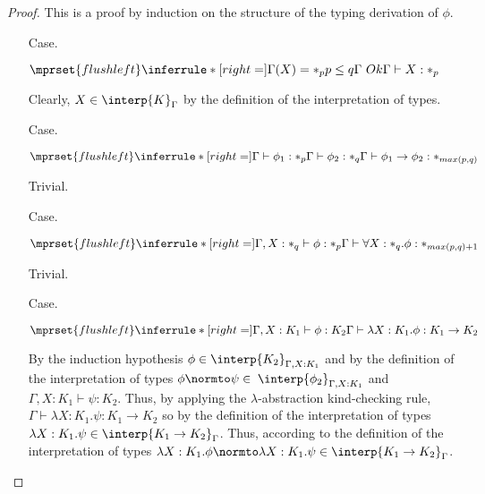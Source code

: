 \begin{proof}
  This is a proof by induction on the structure of the typing derivation of $\phi$.
  
  \begin{itemize}
  \item[Case.]\ \\
    \begin{center}
      \begin{math}
        $$\mprset{flushleft}
        \inferrule* [right=] {
          \Gamma(X) = *_p
          \\
          p \leq q
          \\
          \Gamma\ Ok
        }{\Gamma \vdash X:*_p}
      \end{math}
    \end{center}
    Clearly, $X \in \interp{K}_\Gamma$ by the definition of the interpretation of types.
    
  \item[Case.]\ \\
    \begin{center}
      \begin{math}
        $$\mprset{flushleft}
        \inferrule* [right=] {
          \Gamma \vdash \phi_1 : *_p
          \\
          \Gamma \vdash \phi_2 : *_q
        }{\Gamma \vdash \phi_1 \rightarrow \phi_2 : *_{max(p,q)}}
      \end{math}
    \end{center}
    Trivial.

  \item[Case.]\ \\
    \begin{center}
      \begin{math}
        $$\mprset{flushleft}
        \inferrule* [right=] {
          \Gamma,X : *_q \vdash \phi : *_p
        }{\Gamma \vdash \forall X:*_q.\phi : *_{max(p,q)+1}}
      \end{math}
    \end{center}
    Trivial.
    
  \item[Case.]\ \\
    \begin{center}
      \begin{math}
        $$\mprset{flushleft}
        \inferrule* [right=] {
          \Gamma,X:K_1 \vdash \phi:K_2
        }{\Gamma \vdash \lambda X:K_1.\phi : K_1 \rightarrow K_2}
      \end{math}
    \end{center}
    By the induction hypothesis $\phi \in
    \interp{K_2}_{\Gamma,X:K_1}$ and by the definition of the
    interpretation of types $\phi \normto \psi \in $ 
    $\interp{\phi_2}_{\Gamma,X:K_1}$ and $\Gamma, X:K_1 \vdash
    \psi:K_2$.  Thus, by applying the $\lambda$-abstraction kind-checking
    rule, $\Gamma \vdash \lambda X:K_1.\psi:K_1 \to K_2$ so 
    by the definition of the interpretation of types $\lambda X:K_1.\psi
    \in \interp{K_1 \rightarrow K_2}_\Gamma$.  Thus, according to the
    definition of the interpretation of types $\lambda X:K_1.\phi
    \normto \lambda X:K_1.\psi \in \interp{K_1 \rightarrow K_2}_\Gamma$.
    

\end{itemize}
\end{proof}
